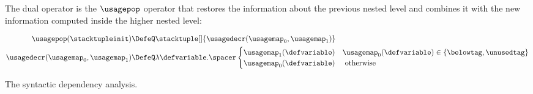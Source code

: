 The dual operator is the $\usagepop$ operator that restores the information about the previous nested level and combines it with the new information computed inside the higher nested level:

\begin{align*}
  \usagepop(\stacktupleinit) &\DefeQ \stacktuple[]{\usagedecr(\usagemap_0, \usagemap_1)} \\
  \usagedecr(\usagemap_0, \usagemap_1) &\DefeQ \lambda \defvariable.\spacer \begin{cases}
    \usagemap_1(\defvariable) & \usagemap_0(\defvariable) \in \{ \belowtag, \unusedtag \} \\
    \usagemap_0(\defvariable) & \text{ otherwise}
  \end{cases}
\end{align*}

\begin{marginfigure}
\caption{The syntactic dependency analysis.}
\end{marginfigure}

